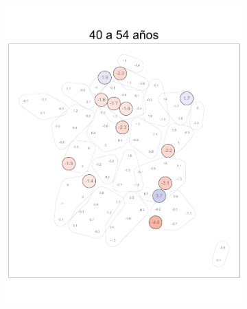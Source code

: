 \begin{figure}
\begin{subfigure}{0.3\textwidth}
	\includegraphics[width = \textwidth]{Figs/Efectos/Dorling_Efectos_Ed4_Modelo_H}
	\end{subfigure}
	~
	\begin{subfigure}{0.3\textwidth}

\end{subfigure}
\end{figure}
